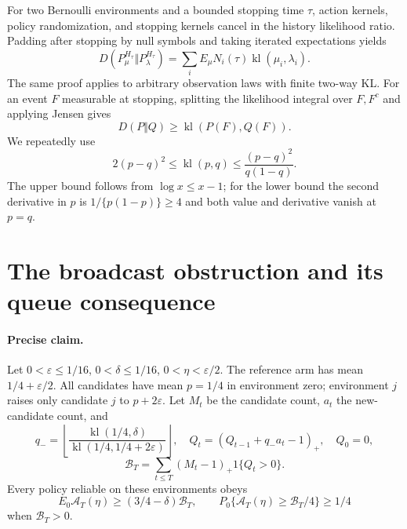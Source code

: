 For two Bernoulli environments and a bounded stopping time $\tau$, action
kernels, policy randomization, and stopping kernels cancel in the history
likelihood ratio. Padding after stopping by null symbols and taking iterated
expectations yields
\begin{equation}
 D(P_\mu^{H_\tau}\Vert P_\lambda^{H_\tau})
 =\sum_iE_\mu N_i(\tau)\operatorname{kl}(\mu_i,\lambda_i).
 \label{eq:app_kl_identity}
\end{equation}
The same proof applies to arbitrary observation laws with finite two-way KL.
For an event $F$ measurable at stopping, splitting the likelihood integral
over $F,F^c$ and applying Jensen gives
\[
 D(P\Vert Q)\ge\operatorname{kl}(P(F),Q(F)).
\]
We repeatedly use
\[
 2(p-q)^2\le\operatorname{kl}(p,q)
 \le\frac{(p-q)^2}{q(1-q)}.
\]
The upper bound follows from $\log x\le x-1$; for the lower bound the second
derivative in $p$ is $1/\{p(1-p)\}\ge4$ and both value and derivative vanish
at $p=q$.

\section{The broadcast obstruction and its queue consequence}
\label{app:broadcast}

\paragraph{Precise claim.}
Let $0<\varepsilon\le1/16$, $0<\delta\le1/16$,
$0<\eta<\varepsilon/2$. The reference arm has mean
$1/4+\varepsilon/2$. All candidates have mean $p=1/4$ in environment zero;
environment $j$ raises only candidate $j$ to $p+2\varepsilon$. Let $M_t$ be
the candidate count, $a_t$ the new-candidate count, and
\[
 q_- =\left\lfloor\frac{\operatorname{kl}(1/4,\delta)}
                         {\operatorname{kl}(1/4,1/4+2\varepsilon)}\right\rfloor,
 \quad Q_t=(Q_{t-1}+q_-a_t-1)_+,\quad Q_0=0,
\]
\[
 \mathcal B_T=\sum_{t\le T}(M_t-1)_+1\{Q_t>0\}.
\]
Every policy reliable on these environments obeys
\[
 E_0\mathcal A_T(\eta)\ge(3/4-\delta)\mathcal B_T,
 \qquad
 P_0\{\mathcal A_T(\eta)\ge\mathcal B_T/4\}\ge1/4
\]
when $\mathcal B_T>0$.


